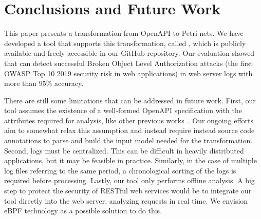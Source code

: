 \section{Conclusions and Future Work}
\label{sec:conclusions}

This paper presents a transformation from OpenAPI to Petri nets. We have developed a tool that supports this transformation, called {\nameTool}, which is publicly available and freely accessible in our GitHub repository. Our evaluation showed that  {\nameTool} can detect successful Broken Object Level Authorization attacks (the first OWASP Top 10 2019 security risk in web applications) in web server logs with more than $95\%$ accuracy.

There are still some limitations that can be addressed in future work. First, our tool assumes the existence of a well-formed OpenAPI specification with the attributes required for analysis, like other previous works~\cite{DBLP:journals/corr/abs-2201-10833, haddad2022openapi}. Our ongoing efforts aim to somewhat relax this assumption and instead require instead source code annotations to parse and build the input model needed for the transformation. Second, logs must be centralized. This can be difficult in heavily distributed applications, but it may be feasible in practice. Similarly, in the case of multiple log files referring to the same period, a chronological sorting of the logs is required before processing. Lastly, our tool only performs offline analysis. A big step to protect the security of RESTful web services would be to integrate our tool directly into the web server, analyzing requests in real time. We envision eBPF technology as a possible solution to do this.
